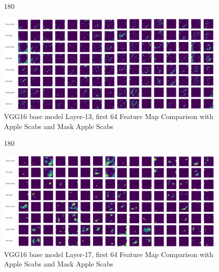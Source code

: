 \begin{figure}
    \centering
    \begin{turn}{180}
        \begin{minipage}{\linewidth}
        \centering
        \includegraphics[width=1\linewidth]{graphics//chapter7/fmap comp mask l13.png}
         \caption{VGG16 base model Layer-13, first 64 Feature Map Comparison with Apple Scabs and Mask Apple Scabs}
         \label{fig:comp-1-3}
        \end{minipage}
    \end{turn}
\end{figure}

\begin{figure}
    \centering
    \begin{turn}{180}
        \begin{minipage}{\linewidth}
        \centering
        \includegraphics[width=1\linewidth]{graphics//chapter7/fmap comp mask l17.png}
         \caption{VGG16 base model Layer-17, first 64 Feature Map Comparison with Apple Scabs and Mask Apple Scabs}
    \label{fig:comp-1-4}
        \end{minipage}
    \end{turn}
\end{figure}

